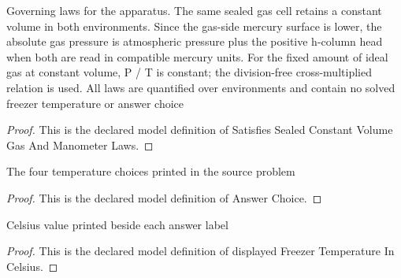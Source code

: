 \begin{definition}
  \label{def:physics:phyx-mini-0365:phyxminiproblems-problemphyxmini0365-satisfiessealedconstantvolumegasandmanometerlaws}
  Governing laws for the apparatus. The same sealed gas cell retains a constant volume in both environments. Since the gas-side mercury surface is lower, the absolute gas pressure is atmospheric pressure plus the positive h-column head when both are read in compatible mercury units. For the fixed amount of ideal gas at constant volume, P / T is constant; the division-free cross-multiplied relation is used. All laws are quantified over environments and contain no solved freezer temperature or answer choice
\end{definition}
\begin{proof}
  This is the declared model definition of Satisfies Sealed Constant Volume Gas And Manometer Laws.
\end{proof}
\begin{definition}
  \label{def:physics:phyx-mini-0365:phyxminiproblems-problemphyxmini0365-answerchoice}
  The four temperature choices printed in the source problem
\end{definition}
\begin{proof}
  This is the declared model definition of Answer Choice.
\end{proof}
\begin{definition}
  \label{def:physics:phyx-mini-0365:phyxminiproblems-problemphyxmini0365-displayedfreezertemperatureincelsius}
  Celsius value printed beside each answer label
\end{definition}
\begin{proof}
  This is the declared model definition of displayed Freezer Temperature In Celsius.
\end{proof}
